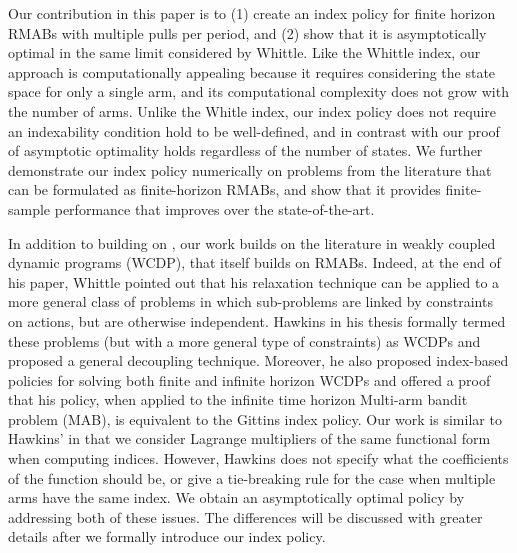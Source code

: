 Our contribution in this paper is to (1) create an index policy for finite horizon RMABs with multiple pulls per period, and (2) show that it is asymptotically optimal in the same limit considered by Whittle.  Like the Whittle index, our approach is computationally appealing because it requires considering the state space for only a single arm, and its computational complexity does not grow with the number of arms.  Unlike the Whitle index, our index policy does not require an indexability condition hold to be well-defined, and in contrast with \cite{weber1990,weber1991} our proof of asymptotic optimality holds regardless of the number of states.  We further demonstrate our index policy numerically on problems from the literature that can be formulated as finite-horizon RMABs, and show that it provides finite-sample performance that improves over the state-of-the-art. 

In addition to building on \cite{whittle1988,weber1990,weber1991}, our work builds on the literature in weakly coupled dynamic programs (WCDP), that itself builds on RMABs.
Indeed, at the end of his paper, Whittle pointed out that his relaxation technique can be applied to a more general class of problems in which sub-problems are linked by constraints on actions, but are otherwise independent. Hawkins in his thesis \citep{Hawkins2003} formally termed these problems (but with a more general type of constraints) as WCDPs and proposed a general decoupling technique. Moreover, he also proposed index-based policies for solving both finite and infinite horizon WCDPs and offered a proof that his policy, when applied to the infinite time horizon Multi-arm bandit problem (MAB), is equivalent to the Gittins index policy. Our work is similar to Hawkins' in that we consider Lagrange multipliers of the same functional form when computing indices. However, Hawkins does not specify what the coefficients of the function should be, or give a tie-breaking rule for the case when multiple arms have the same index. We obtain an asymptotically optimal policy by addressing both of these issues. The differences will be discussed with greater details after we formally introduce our index policy.

